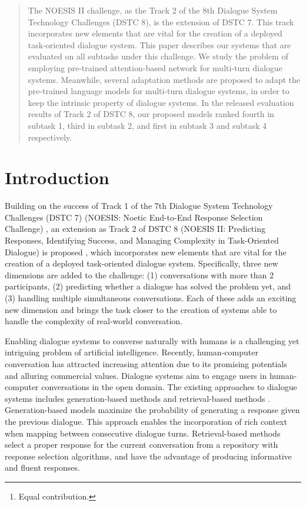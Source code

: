 \documentclass[letterpaper]{article} \usepackage{aaai20}  \usepackage{times}  \usepackage{helvet} \usepackage{courier}  \usepackage[hyphens]{url}  \usepackage{graphicx} \urlstyle{rm} \def\UrlFont{\rm}  \usepackage{graphicx}  \frenchspacing  \setlength{\pdfpagewidth}{8.5in}  \setlength{\pdfpageheight}{11in}
\author{Jia-Chen Gu$^1$\thanks{Equal contribution.}, Tianda Li$^2$\footnotemark[1], Quan Liu$^1$, Xiaodan Zhu$^2$, Zhen-Hua Ling$^1$, Yu-Ping Ruan$^1$ \\
  $^1$National Engineering Laboratory for Speech and Language Information Processing, \\
      University of Science and Technology of China, Hefei, China \\
  $^2$ECE \& Ingenuity Labs, Queen's University, Kingston, Canada \\
{\tt \{gujc,ypruan\}@mail.ustc.edu.cn}, {\tt \{tianda.li,xiaodan.zhu\}@queensu.ca}, \\ {\tt \{quanliu,zhling\}@ustc.edu.cn}
}
\begin{document}
\maketitle

\begin{abstract}
  The NOESIS II challenge, as the Track 2 of the 8th Dialogue System Technology Challenges (DSTC 8), is the extension of DSTC 7.
  This track incorporates new elements that are vital for the creation of a deployed task-oriented dialogue system.
This paper describes our systems that are evaluated on all subtasks under this challenge.
  We study the problem of employing pre-trained attention-based network for multi-turn dialogue systems.
  Meanwhile, several adaptation methods are proposed to adapt the pre-trained language models for multi-turn dialogue systems, in order to keep the intrinsic property of dialogue systems.
  In the released evaluation results of Track 2 of DSTC 8, our proposed models ranked fourth in subtask 1, third in subtask 2, and first in subtask 3 and subtask 4 respectively.
\end{abstract}

\section{Introduction}

  Building on the success of Track 1 of the 7th Dialogue System Technology Challenges (DSTC 7) (NOESIS: Noetic End-to-End Response Selection Challenge) \cite{gunasekara2019dstc7}, an extension as Track 2 of DSTC 8 (NOESIS II: Predicting Responses, Identifying Success, and Managing Complexity in Task-Oriented Dialogue) is proposed \cite{DSTC8}, which incorporates new elements that are vital for the creation of a deployed task-oriented dialogue system.
  Specifically, three new dimensions are added to the challenge:
  (1) conversations with more than 2 participants,
  (2) predicting whether a dialogue has solved the problem yet,
  and (3) handling multiple simultaneous conversations.
  Each of these adds an exciting new dimension and brings the task closer to the creation of systems able to handle the complexity of real-world conversation.

  Enabling dialogue systems to converse naturally with humans is a challenging yet intriguing problem of artificial intelligence.
  Recently, human-computer conversation has attracted increasing attention due to its promising potentials and alluring commercial values.
  Dialogue systems aim to engage users in human-computer conversations in the open domain.
  The existing approaches to dialogue systems includes generation-based methods \cite{DBLP:conf/acl/ShangLL15,DBLP:conf/aaai/SerbanSBCP16} and retrieval-based methods \cite{DBLP:conf/sigdial/LowePSP15,DBLP:journals/dad/LowePSCLP17,DBLP:conf/acl/WuWXZL17,DBLP:conf/coling/ZhangLZZL18}. Generation-based models maximize the probability of generating a response given the previous dialogue.
  This approach enables the incorporation of rich context when mapping between consecutive dialogue turns.
  Retrieval-based methods select a proper response for the current conversation from a repository with response selection algorithms, and have the advantage of producing informative and fluent responses.
\end{document}
